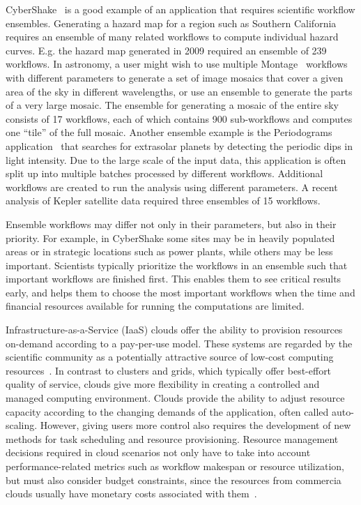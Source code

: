 \documentclass[conference]{IEEEtran}
\begin{document}
CyberShake~\cite{Callaghan2011} is a good example of an application that
requires scientific workflow ensembles. Generating a hazard map for a region
such as Southern California requires an ensemble of many related workflows to
compute individual hazard curves. E.g. the hazard map generated in 2009 required an ensemble of 239 workflows. In astronomy,
a user might wish to use multiple Montage~\cite{Deelman2008}
workflows with different parameters to generate a set of image mosaics that
cover a given area of the sky in different wavelengths, or use an ensemble to generate
the parts of a very large mosaic. The
ensemble for generating a mosaic of the entire sky consists of 17 workflows, each of which contains 900 sub-workflows and
computes one ``tile'' of the full mosaic. Another ensemble example is the
Periodograms application~\cite{Vockler2011} that searches for extrasolar planets
by detecting the periodic dips in light intensity. Due to the large scale of the
input data, this application is often split up into multiple batches processed
by different workflows. Additional workflows are created to run the analysis
using different parameters. A recent analysis of Kepler satellite data
required three ensembles of 15 workflows.


Ensemble workflows may differ not only in their parameters, but also in their
priority. For example, in CyberShake some sites may be in heavily populated
areas or in strategic locations such as power plants, while others may be less
important. Scientists typically prioritize the workflows in an ensemble such
that important workflows are finished first. This enables them to see critical
results early, and helps them to choose the most important workflows when the
time and financial resources available for running the computations are limited.

Infrastructure-as-a-Service (IaaS) clouds offer the ability to provision 
resources on-demand according to a pay-per-use model. These systems 
are regarded by the scientific community as a potentially attractive source of 
low-cost computing resources~\cite{Ostermann2010, Keahey2009}. In contrast 
to clusters and grids, which typically offer best-effort quality of service, clouds 
give more flexibility in creating a controlled and managed computing environment.
Clouds provide the ability to adjust resource capacity according to the changing
demands of the application, often called auto-scaling. However, giving users 
more control also requires the development of new methods for task 
scheduling and resource provisioning. Resource management decisions required 
in cloud scenarios not only have to take into account performance-related 
metrics such as workflow makespan or resource utilization, but must also consider
budget constraints, since the resources from commercia clouds
usually have monetary costs associated with them~\cite{Durkee2010}.
\end{document}
